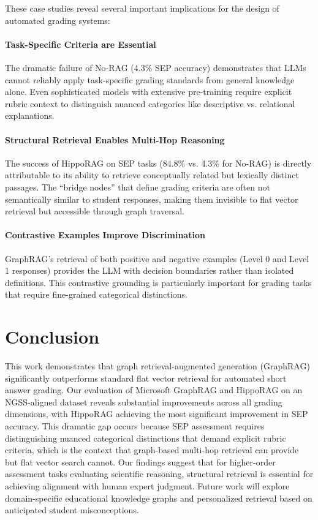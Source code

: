 \documentclass{edm_article}
\begin{document}
These case studies reveal several important implications for the design of automated grading systems:
\vspace{-12pt}
\paragraph{Task-Specific Criteria are Essential}
The dramatic failure of No-RAG (4.3\% SEP accuracy) demonstrates that LLMs cannot reliably apply task-specific grading standards from general knowledge alone. Even sophisticated models with extensive pre-training require explicit rubric context to distinguish nuanced categories like descriptive vs. relational explanations.
\vspace{-12pt}
\paragraph{Structural Retrieval Enables Multi-Hop Reasoning}
The success of HippoRAG on SEP tasks (84.8\% vs. 4.3\% for No-RAG) is directly attributable to its ability to retrieve conceptually related but lexically distinct passages. The ``bridge nodes'' that define grading criteria are often not semantically similar to student responses, making them invisible to flat vector retrieval but accessible through graph traversal.
\vspace{-12pt}
\paragraph{Contrastive Examples Improve Discrimination}
GraphRAG's retrieval of both positive and negative examples (Level 0 and Level 1 responses) provides the LLM with decision boundaries rather than isolated definitions. This contrastive grounding is particularly important for grading tasks that require fine-grained categorical distinctions.


\section{Conclusion}
This work demonstrates that graph retrieval-augmented generation (GraphRAG) significantly outperforms standard flat vector retrieval for automated short answer grading. Our evaluation of Microsoft GraphRAG and HippoRAG on an NGSS-aligned dataset reveals substantial improvements across all grading dimensions, with HippoRAG achieving the most significant improvement in SEP accuracy. This dramatic gap occurs because SEP assessment requires distinguishing nuanced categorical distinctions that demand explicit rubric criteria, which is the context that graph-based multi-hop retrieval can provide but flat vector search cannot.
Our findings suggest that for higher-order assessment tasks evaluating scientific reasoning, structural retrieval is essential for achieving alignment with human expert judgment. Future work will explore domain-specific educational knowledge graphs and personalized retrieval based on anticipated student misconceptions.
\end{document}
